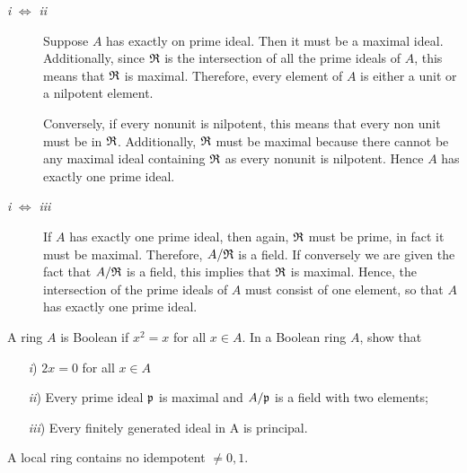 \documentclass[10pt]{amsart}
\begin{document}
\begin{solution}
    \begin{description}
        \item[\emph{i} $\iff$ \emph{ii}] Suppose $A$ has exactly on prime ideal. Then it must be a maximal ideal. 
        Additionally, since $\mathfrak{R}$ is 
        the intersection of all the prime ideals of $A$, this means that $\mathfrak{R}$ is maximal. 
        Therefore, every element of $A$ is either a unit or a nilpotent element. 

        Conversely, if every nonunit is nilpotent, this means that every non unit must be in $\mathfrak{R}$. 
        Additionally, $\mathfrak{R}$ must be maximal because there cannot be any maximal ideal containing $\mathfrak{R}$ 
        as every nonunit is nilpotent. Hence $A$ has exactly one prime ideal. 

        \item[\emph{i} $\iff$ \emph{iii}]
        If $A$ has exactly one prime ideal, then again, $\mathfrak{R}$ must be prime, in fact it must be maximal. 
        Therefore, $A/\mathfrak{R}$ is a field. If conversely we are given the fact that $A/\mathfrak{R}$ is a field, 
        this implies that $\mathfrak{R}$ is maximal. Hence, the intersection of the prime ideals 
        of $A$ must consist of one element, so that $A$ has exactly one prime ideal.

    \end{description}
\end{solution}

\begin{exercise}
    A ring $A$ is Boolean if $x^2 = x$ for all $x \in A$. In a Boolean ring 
    $A$, show that
    \begin{itemize}
        \item[\emph{i})] $2x = 0$ for all $x \in A$
        \item[\emph{ii})] Every prime ideal $\mathfrak{p}$ is maximal and 
        $A/\mathfrak{p}$ is a field with two elements;
        \item[\emph{iii})] Every finitely generated ideal in A is principal.
    \end{itemize}
\end{exercise}

\begin{exercise}
    A local ring contains no idempotent $\ne 0,1 $.
\end{exercise}
\end{document}
